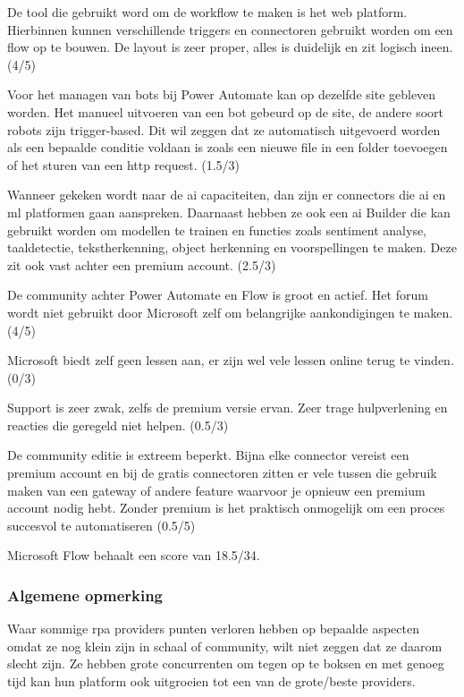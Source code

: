 De tool die gebruikt word om de \gls{workflow} te maken is het web platform. Hierbinnen kunnen verschillende triggers en connectoren gebruikt worden om een flow op te bouwen. De layout is zeer proper, alles is duidelijk en zit logisch ineen. (4/5)

Voor het managen van bots bij Power Automate kan op dezelfde site gebleven worden. Het manueel uitvoeren van een bot gebeurd op de site, de andere soort robots zijn trigger-based. Dit wil zeggen dat ze automatisch uitgevoerd worden als een bepaalde conditie voldaan is zoals een nieuwe file in een folder toevoegen of het sturen van een \acrshort{http} request. (1.5/3)

Wanneer gekeken wordt naar de \acrshort{ai} capaciteiten, dan zijn er connectors die \acrshort{ai} en \acrshort{ml} platformen gaan aanspreken. Daarnaast hebben ze ook een \acrshort{ai} Builder die kan gebruikt worden om modellen te trainen en functies zoals sentiment analyse, taaldetectie, tekstherkenning, object herkenning en voorspellingen te maken. Deze zit ook vast achter een premium account. (2.5/3)

De community achter Power Automate en Flow is groot en actief. Het forum wordt niet gebruikt door Microsoft zelf om belangrijke aankondigingen te maken. (4/5)

Microsoft biedt zelf geen lessen aan, er zijn wel vele lessen online terug te vinden. (0/3)

Support is zeer zwak, zelfs de premium versie ervan. Zeer trage hulpverlening en reacties die geregeld niet helpen. (0.5/3)

De community editie is extreem beperkt. Bijna elke connector vereist een premium account en bij de gratis connectoren zitten er vele tussen die gebruik maken van een gateway of andere feature waarvoor je opnieuw een premium account nodig hebt. Zonder premium is het praktisch onmogelijk om een proces succesvol te automatiseren (0.5/5)

Microsoft Flow behaalt een score van 18.5/34.


\subsubsection{Algemene opmerking}
Waar sommige \acrshort{rpa} providers punten verloren hebben op bepaalde aspecten omdat ze nog klein zijn in schaal of community, wilt niet zeggen dat ze daarom slecht zijn. Ze hebben grote concurrenten om tegen op te boksen en met genoeg tijd kan hun platform ook uitgroeien tot een van de grote/beste providers.


